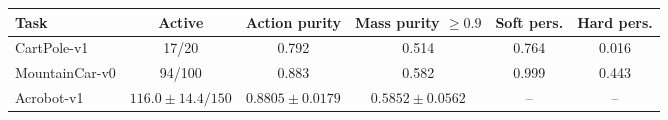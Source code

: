 \begin{tabular}{lccccc}
\toprule
Task & Active & Action purity & Mass purity $\geq 0.9$ & Soft pers. & Hard pers. \\
\midrule
CartPole-v1 & 17/20 & 0.792 & 0.514 & 0.764 & 0.016 \\
MountainCar-v0 & 94/100 & 0.883 & 0.582 & 0.999 & 0.443 \\
Acrobot-v1 & $116.0\pm14.4/150$ & $0.8805\pm0.0179$ & $0.5852\pm0.0562$ & -- & -- \\
\bottomrule
\end{tabular}
